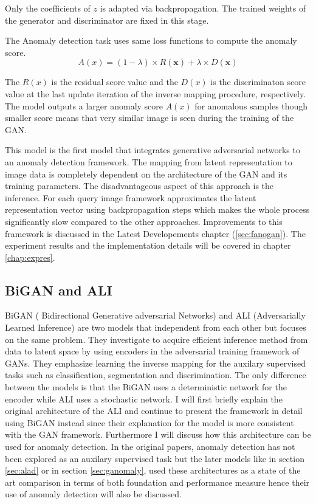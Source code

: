 Only the coefficients of $z$ is adapted via backpropagation. The trained weights of the generator
and discriminator are fixed in this stage. \cite{Schlegl2017UnsupervisedAD}

The Anomaly detection task uses same loss functions to compute the anomaly score. 
$$A(x) = (1 - \lambda ) \times R(\boldsymbol{x}) + \lambda \times D(\boldsymbol{x}) $$

The $R(x)$ is the residual score value and the $D(x)$ is the discriminaton score value at the last
update iteration of the inverse mapping procedure, respectively. The model outputs a larger anomaly
score $A(x)$ for anomalous samples though smaller score means that very similar image is seen during
the training of the GAN. 

This model is the first model that integrates generative adversarial networks to an anomaly
detection framework. The mapping from latent representation to image data is completely dependent on
the architecture of the GAN and its training parameters. The disadvantageous aspect of this approach
is the inference. For each query image framework approximates the latent representation vector using
backpropagation steps which makes the whole process significantly slow compared to the other
approaches. Improvements to this framework is discussed in the Latest Developements chapter
(\ref{sec:fanogan}). The experiment results and the implementation details will be covered in
chapter \ref{chap:expres}.

\subsection{BiGAN and ALI}
\label{sec:bigan}

 BiGAN ( Bidirectional Generative adversarial Networks) \cite{Donahue2017AdversarialFL} and ALI
 (Adversarially Learned Inference) \cite{Dumoulin2017AdversariallyLI} are two models that
 independent from each other but focuses on the same problem. They investigate to acquire efficient
 inference method from data to latent space by using encoders in the adversarial training framework
 of GANs. They emphasize learning the inverse mapping for the auxilary supervised tasks such as
 classification, segmentation and discrimination. The only difference between the models is that the
 BiGAN uses a deterministic network for the encoder while ALI uses a stochastic network. I will
 first briefly explain the original architecture of the ALI and continue to present the framework in
 detail using BiGAN instead since their explanation for the model is more consistent with the GAN
 framework. Furthermore I will discuss how this architecture can be used for anomaly detection. In
 the original papers, anomaly detection has not been explored as an auxilary supervised task but the
 later models like in section \ref{sec:alad} or in section \ref{sec:ganomaly}, used these
 architectures as a state of the art comparison in terms of both foundation and performance measure
 hence their use of anomaly detection will also be discussed.

